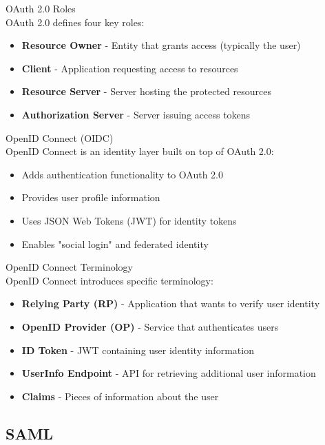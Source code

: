 \begin{concept}{OAuth 2.0 Roles}\\
OAuth 2.0 defines four key roles:
\begin{itemize}
    \item \textbf{Resource Owner} - Entity that grants access (typically the user)
    \item \textbf{Client} - Application requesting access to resources
    \item \textbf{Resource Server} - Server hosting the protected resources
    \item \textbf{Authorization Server} - Server issuing access tokens
\end{itemize}
\end{concept}

\begin{definition}{OpenID Connect (OIDC)}\\
OpenID Connect is an identity layer built on top of OAuth 2.0:
\begin{itemize}
    \item Adds authentication functionality to OAuth 2.0
    \item Provides user profile information
    \item Uses JSON Web Tokens (JWT) for identity tokens
    \item Enables "social login" and federated identity
\end{itemize}
\end{definition}

\begin{concept}{OpenID Connect Terminology}\\
OpenID Connect introduces specific terminology:
\begin{itemize}
    \item \textbf{Relying Party (RP)} - Application that wants to verify user identity
    \item \textbf{OpenID Provider (OP)} - Service that authenticates users
    \item \textbf{ID Token} - JWT containing user identity information
    \item \textbf{UserInfo Endpoint} - API for retrieving additional user information
    \item \textbf{Claims} - Pieces of information about the user
\end{itemize}
\end{concept}

\subsection{SAML}

